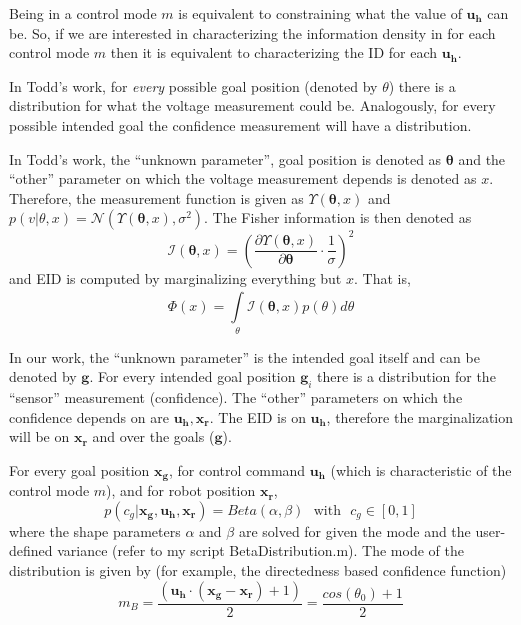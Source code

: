 \documentclass[]{article}
\begin{document}
Being in a control mode $m$ is equivalent to constraining what the value of $\boldsymbol{u_h}$ can be. So, if we are interested in characterizing the information density in for each control mode $m$ then it is equivalent to characterizing the ID for each $\boldsymbol{u_h}$. 

In Todd's work, for \textit{every} possible goal position (denoted by $\theta$) there is a distribution for what the voltage measurement could be. Analogously, for every possible intended goal the confidence measurement will have a distribution. 

In Todd's work, the ``unknown parameter'', goal position is denoted as $\boldsymbol{\theta}$ and the ``other'' parameter on which the voltage measurement depends is denoted as $x$. Therefore, the measurement function is given as $\Upsilon(\boldsymbol{\theta}, x)$ and $p(v | \theta, x) =  \mathcal{N}(\Upsilon(\boldsymbol{\theta}, x), \sigma^2)$. The Fisher information is then denoted as 
\begin{equation*}
\mathcal{I}(\boldsymbol{\theta}, x) = \left(\frac{\partial\Upsilon(\boldsymbol{\theta}, x)}{\partial \boldsymbol{\theta}}\cdot\frac{1}{\sigma}\right)^2
\end{equation*}
and EID is computed by marginalizing everything but $x$. That is, 
\begin{equation*}
\Phi(x)  = \int\limits_{\theta}^{}\mathcal{I}(\boldsymbol{\theta}, x)p(\theta)d\theta
\end{equation*}

In our work, the ``unknown parameter'' is the intended goal itself and can be denoted by $\boldsymbol{g}$. For every intended goal position $\boldsymbol{g}_i$ there is a distribution for the ``sensor'' measurement (confidence). The ``other'' parameters on which the confidence depends on are $\boldsymbol{u_h}, \boldsymbol{x_r}$. The EID is on $\boldsymbol{u_h}$, therefore the marginalization will be on $\boldsymbol{x_r}$ and over the goals ($\boldsymbol{g}$).  

For every goal position $\boldsymbol{x_g}$, for control command $\boldsymbol{u_h}$ (which is characteristic of the control mode $m$), and for robot position $\boldsymbol{x_r}$,
\begin{equation*}
p(c_g | \boldsymbol{x_g}, \boldsymbol{u_h}, \boldsymbol{x_r}) = Beta(\alpha, \beta) ~~~ \text{with} ~~~ c_g \in [0, 1]
\end{equation*}
where the shape parameters $\alpha$ and $\beta$ are solved for given the mode and the user-defined variance (refer to my script BetaDistribution.m). 
The mode of the distribution is given by (for example, the directedness based confidence function)
\begin{equation*}
m_B = \frac{(\boldsymbol{u_h}\cdot(\boldsymbol{x_g} - \boldsymbol{x_r}) +  1)}{2} = \frac{cos(\theta_0) + 1}{2}
\end{equation*}
\end{document}
